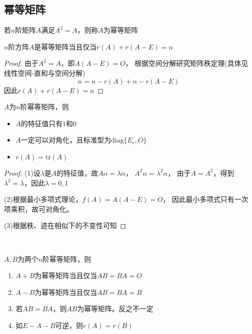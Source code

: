 \subsection{幂等矩阵}

\begin{definition}[幂等矩阵]
  若$n$阶矩阵$A$满足$A^2 = A$，则称$A$为幂等矩阵
\end{definition}

\begin{theorem}[幂等矩阵充要条件]
  $n$阶方阵$A$是幂等矩阵当且仅当$r(A) + r(A - E) = n$
\end{theorem}

\begin{proof}
  由于$A^2 = A$，即$A(A - E) = O$，
  根据空间分解研究矩阵秩定理(具体见线性空间-直和与空间分解)
  \begin{equation*}
    n = n - r(A) + n - r(A-E)
  \end{equation*}
  因此$r(A) + r(A - E) = n$
\end{proof}

\begin{theorem}[幂等矩阵的性质]
  $A$为$n$阶幂等矩阵，则
  \begin{itemize}
  \item $A$的特征值只有$1$和$0$
  \item $A$一定可以对角化，且标准型为$\mathrm{diag}\{E_r,O\}$
  \item $r(A) = \mathrm{tr}(A)$
  \end{itemize}
\end{theorem}

\begin{proof}
  (1)设$\lambda$是$A$的特征值，故$A\alpha = \lambda \alpha$，
  $A^2 \alpha = \lambda^2 \alpha$，
  由于$A = A^2$，得到$\lambda^2 = \lambda$，因此$\lambda = 0, 1$

  (2)根据最小多项式理论，$f(A) = A(A - E) = O$，
  因此最小多项式只有一次项乘积，故可对角化。

  (3)根据秩、迹在相似下的不变性可知
\end{proof}

~

\begin{theorem}[加减乘法的幂等性]
  $A,B$为两个$n$阶幂等矩阵，则
  \begin{enumerate}
  \item $A+B$为幂等矩阵当且仅当$AB = BA = O$
  \item $A-B$为幂等矩阵当且仅当$AB = BA = B$
  \item 若$AB = BA$，则$AB$为幂等矩阵。反之不一定
  \item 如$E - A - B$可逆，则$r(A) = r(B)$
  \end{enumerate}
\end{theorem}

